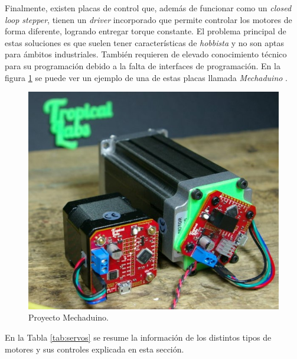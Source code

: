 Finalmente, existen placas de control que, además de funcionar como un \textit{closed loop stepper}, tienen un \textit{driver} incorporado que permite controlar los motores de forma diferente, logrando entregar torque constante. El problema principal de estas soluciones es que suelen tener características de \textit{hobbista} y no son aptas para ámbitos industriales. También requieren de elevado conocimiento técnico para su programación debido a la falta de interfaces de programación. En la figura \ref{fig:mechaduino} se puede ver un ejemplo de una de estas placas llamada \textit{Mechaduino} \citep{web_mechaduino}.

\begin{figure}[h!]
	\centering
	\includegraphics[scale=.6]{./Figures/mechaduino.jpg}
	\caption{Proyecto Mechaduino\protect\footnotemark .}
	\label{fig:mechaduino}
\end{figure}


En la Tabla \ref{tab:servos} se resume la información de los distintos tipos de motores y sus controles explicada en esta sección.


